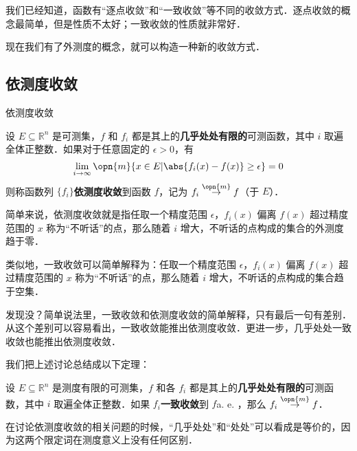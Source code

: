 

我们已经知道，函数有“逐点收敛”和“一致收敛”等不同的收敛方式．逐点收敛的概念最简单，但是性质不太好；一致收敛的性质就非常好．

现在我们有了外测度的概念，就可以构造一种新的收敛方式．

\subsection{依测度收敛}

\begin{definition}{依测度收敛}

设 $E\subseteq \mathbb{R}^n$ 是可测集，$f$ 和 $f_i$ 都是其上的\textbf{几乎处处有限的}可测函数，其中 $i$ 取遍全体正整数．如果对于任意固定的 $\epsilon>0$，有
\begin{equation}
\lim\limits_{i\to\infty}\opn{m}\{x\in E|\abs{f_i(x)-f(x)}\geq\epsilon\}=0
\end{equation}
则称函数列 $\{f_i\}$\textbf{依测度收敛}到函数 $f$，记为 $f_i\overset{\opn{m}}\to f$（于 $E$）．

\end{definition}

简单来说，依测度收敛就是指任取一个精度范围 $\epsilon$，$f_i(x)$ 偏离 $f(x)$ 超过精度范围的 $x$ 称为“不听话”的点，那么随着 $i$ 增大，不听话的点构成的集合的外测度趋于零．

类似地，一致收敛可以简单解释为：任取一个精度范围 $\epsilon$，$f_i(x)$ 偏离 $f(x)$ 超过精度范围的 $x$ 称为“不听话”的点，那么随着 $i$ 增大，不听话的点构成的集合趋于空集．

发现没？简单说法里，一致收敛和依测度收敛的简单解释，只有最后一句有差别．从这个差别可以容易看出，一致收敛能推出依测度收敛．更进一步，几乎处处一致收敛也能推出依测度收敛．

我们把上述讨论总结成以下定理：



\begin{theorem}{}\label{LimMs_the2}

设 $E\subseteq \mathbb{R}^n$ 是测度有限的可测集，$f$ 和各 $f_i$ 都是其上的\textbf{几乎处处有限的}可测函数，其中 $i$ 取遍全体正整数．如果 $f_i$\textbf{一致收敛}到 $f$a. e.  ，那么 $f_i\overset{\opn{m}}\to f$．

\end{theorem}



在讨论依测度收敛的相关问题的时候，“几乎处处”和“处处”可以看成是等价的，因为这两个限定词在测度意义上没有任何区别．

